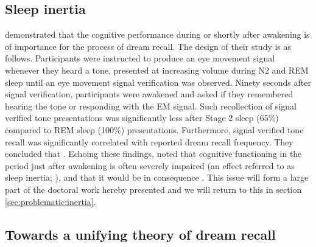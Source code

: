 \subsection{Sleep inertia}
\label{sec:dream-recall:theories:inertia}

\citet{conduit_poor_2004} demonstrated that the cognitive performance during or shortly after awakening is of importance for the process of dream recall. The design of their study is as follows. Participants were instructed to produce an eye movement signal whenever they heard a tone, presented at increasing volume during N2 and REM sleep until an eye movement signal verification was observed.  Ninety seconds after signal verification, participants were awakened and asked if they remembered hearing the tone or responding with the EM signal. Such recollection of signal verified tone presentations was significantly less after Stage 2 sleep (65\%) compared to REM sleep (100\%) presentations. Furthermore, signal verified tone recall was significantly correlated with reported dream recall frequency. They concluded that  \citep{conduit_poor_2004}.
Echoing these findings, \citet{schredl_factors_2003} noted that cognitive functioning in the period just after awakening is often severely impaired (an effect referred to as sleep inertia; \citealp{tassi_sleep_2000, trotti_waking_2016}), and that it would be in consequence . This issue will form a large part of the doctoral work hereby presented and we will return to this in section \ref{sec:problematic:inertia}.

\subsection{Towards a unifying theory of dream recall}
\label{sec:dream-recall:theories:unifying}

